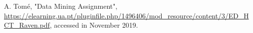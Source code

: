 \documentclass[conference]{IEEEtran}
\begin{document}







\begin{thebibliography}{00}
 A. Tomé, "Data Mining Assignment", \url{https://elearning.ua.pt/pluginfile.php/1496406/mod_resource/content/3/ED_HCT_Raven.pdf}, accessed in November 2019.
\end{thebibliography}
\vspace{12pt}
\end{document}
